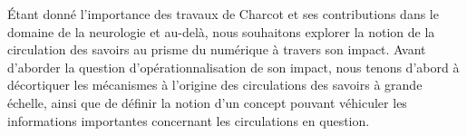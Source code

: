 Étant donné l'importance des travaux de Charcot et ses contributions dans le domaine de la neurologie et au-delà, nous souhaitons explorer la notion de la circulation des savoirs au prisme du numérique à travers son impact. Avant d'aborder la question d'opérationnalisation de son impact, nous tenons d'abord à décortiquer les mécanismes à l'origine des circulations des savoirs à grande échelle, ainsi que de définir la notion d'un \og{}concept\fg{} pouvant véhiculer les informations importantes concernant les circulations en question.  










